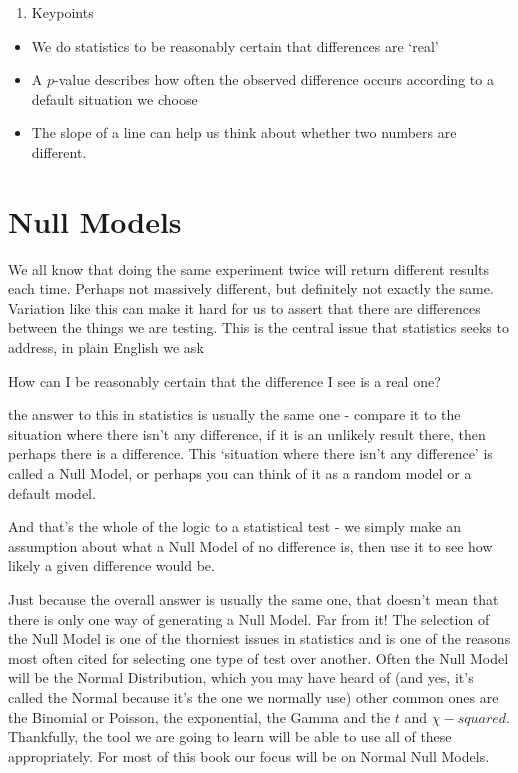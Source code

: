 \documentclass[
]{book}
\providecommand{\tightlist}{%
  \setlength{\itemsep}{0pt}\setlength{\parskip}{0pt}}
\newenvironment{myquote}
{\begin{large}
\begin{itshape}
\begin{minipage}{6cm}
}
{
\begin{vspace}{15mm}
\end{vspace}
\end{minipage}
\end{itshape}
\end{large} 
}
\newenvironment{sidenote}
{ \begin{tcolorbox}[colbacktitle=blue!50!white,
title=huh?,coltitle=white,
fonttitle=\bfseries] }
{  \end{tcolorbox} }
\begin{document}
\begin{enumerate}
\def\labelenumi{\arabic{enumi}.}
\setcounter{enumi}{2}
\tightlist
\item
  Keypoints
\end{enumerate}

\begin{itemize}
\tightlist
\item
  We do statistics to be reasonably certain that differences are `real'
\item
  A \(p\)-value describes how often the observed difference occurs according to a default situation we choose
\item
  The slope of a line can help us think about whether two numbers are different.
\end{itemize}

\hypertarget{null-models}{%
\section{Null Models}\label{null-models}}

We all know that doing the same experiment twice will return different results each time. Perhaps not massively different, but definitely not exactly the same. Variation like this can make it hard for us to assert that there are differences between the things we are testing. This is the central issue that statistics seeks to address, in plain English we ask

\begin{myquote}
How can I be reasonably certain that the difference I see is a real one?
\end{myquote}

the answer to this in statistics is usually the same one - compare it to the situation where there isn't any difference, if it is an unlikely result there, then perhaps there is a difference. This `situation where there isn't any difference' is called a Null Model, or perhaps you can think of it as a random model or a default model.

And that's the whole of the logic to a statistical test - we simply make an assumption about what a Null Model of no difference is, then use it to see how likely a given difference would be.

\begin{sidenote}
Just because the overall answer is usually the same one, that doesn't mean that there is only one way of generating a Null Model. Far from it! The selection of the Null Model is one of the thorniest issues in statistics and is one of the reasons most often cited for selecting one type of test over another. Often the Null Model will be the Normal Distribution, which you may have heard of (and yes, it's called the Normal because it's the one we normally use) other common ones are the Binomial or Poisson, the exponential, the Gamma and the \(t\) and \(\chi-squared\). Thankfully, the tool we are going to learn will be able to use all of these appropriately. For most of this book our focus will be on Normal Null Models.
\end{sidenote}
\end{document}
